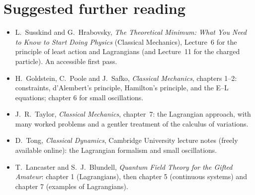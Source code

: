 \documentclass[11pt]{article}
\begin{document}
\section*{Suggested further reading}
\begin{itemize}
  \item L.~Susskind and G.~Hrabovsky, \emph{The Theoretical Minimum: What You Need to Know to Start Doing Physics} (Classical Mechanics), Lecture~6 for the principle of least action and Lagrangians (and Lecture~11 for the charged particle). An accessible first pass.
  \item H.~Goldstein, C.~Poole and J.~Safko, \emph{Classical Mechanics}, chapters 1--2: constraints, d'Alembert's principle, Hamilton's principle, and the E--L equations; chapter 6 for small oscillations.
  \item J.~R.~Taylor, \emph{Classical Mechanics}, chapter~7: the Lagrangian approach, with many worked problems and a gentler treatment of the calculus of variations.
  \item D.~Tong, \emph{Classical Dynamics}, Cambridge University lecture notes (freely available online): the Lagrangian formalism and small oscillations.
  \item T.~Lancaster and S.~J.~Blundell, \emph{Quantum Field Theory for the Gifted Amateur}: chapter 1 (Lagrangians), then chapter 5 (continuous systems) and chapter 7 (examples of Lagrangians).
\end{itemize}
\end{document}

